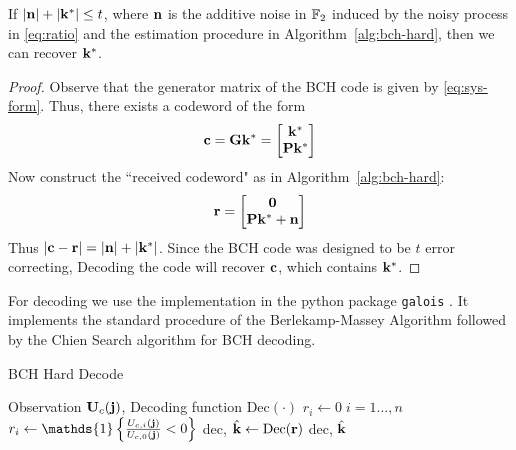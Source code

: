 \begin{lemma}\label{lem:decoding}
    If $\left\lvert \mathbf n \right\rvert + \left\lvert \mathbf k^* \right\rvert \leq t$, where $\mathbf n$ is the additive noise in $\mathbb F_2$ induced by the noisy process in \eqref{eq:ratio} and the estimation procedure in Algorithm~\ref{alg:bch-hard}, then we can recover $\mathbf k^*$.
\end{lemma}
\begin{proof}
    Observe that the generator matrix of the BCH code is given by \eqref{eq:sys-form}. Thus, there exists a codeword of the form
    \begin{equation}
    \mathbf c = \mathbf G \mathbf k^*= 
\begin{bmatrix}
\mathbf k^*\\
\mathbf P \mathbf k^*
\end{bmatrix}
\end{equation}
Now construct the ``received codeword" as in Algorithm~\ref{alg:bch-hard}:
    \begin{equation}
    \mathbf r = 
\begin{bmatrix}
\boldsymbol{0}\\
\mathbf P \mathbf k^* + \mathbf n
\end{bmatrix}
\end{equation}
Thus $\left\lvert \mathbf c- \mathbf r \right\rvert = \left\lvert \mathbf n \right\rvert + \left\lvert \mathbf k^* \right\rvert$. Since the BCH code was designed to be $t$ error correcting, Decoding the code will recover $\mathbf c$, which contains $\mathbf k^*$.
\end{proof}
For decoding we use the implementation in the python package \verb|galois| \cite{Hostetter_Galois_2020}. It implements the standard procedure of the Berlekamp-Massey Algorithm followed by the Chien Search algorithm for BCH decoding. 
\begin{algorithm}
   \caption{BCH Hard Decode}
   \label{alg:bch-hard}
\begin{algorithmic}[1]
    Observation $\mathbf U_c(\mathbf j)$, Decoding function $\mathrm{Dec}(\cdot)$
   \State $r_i \gets 0 \; i=1\dotsc, n$
        \State $r_i \gets \mathds{1}\left\{ \frac{U_{c,i}(\bj)}{U_{c,0}(\bj) } < 0 \right\}$
   \EndFor
    \State dec, $ \hat{\mathbf k} \gets \mathrm{Dec}(\mathbf r)$
     dec, $\hat{\mathbf k}$ 
\end{algorithmic}
\end{algorithm}

